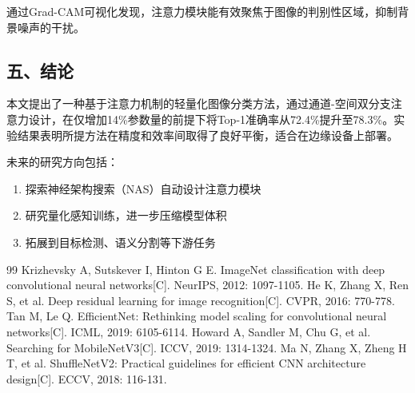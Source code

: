 \documentclass{harryopo-paper}
\begin{document}
通过Grad-CAM可视化发现，注意力模块能有效聚焦于图像的判别性区域，抑制背景噪声的干扰。

\subsection*{五、结论}

本文提出了一种基于注意力机制的轻量化图像分类方法，通过通道-空间双分支注意力设计，在仅增加14\%参数量的前提下将Top-1准确率从72.4\%提升至78.3\%。实验结果表明所提方法在精度和效率间取得了良好平衡，适合在边缘设备上部署。

未来的研究方向包括：

\begin{enumerate}
  \item 探索神经架构搜索（NAS）自动设计注意力模块
  \item 研究量化感知训练，进一步压缩模型体积
  \item 拓展到目标检测、语义分割等下游任务
\end{enumerate}

\begin{thebibliography}{99}
 Krizhevsky A, Sutskever I, Hinton G E. ImageNet classification with deep convolutional neural networks[C]. NeurIPS, 2012: 1097-1105.
 He K, Zhang X, Ren S, et al. Deep residual learning for image recognition[C]. CVPR, 2016: 770-778.
 Tan M, Le Q. EfficientNet: Rethinking model scaling for convolutional neural networks[C]. ICML, 2019: 6105-6114.
 Howard A, Sandler M, Chu G, et al. Searching for MobileNetV3[C]. ICCV, 2019: 1314-1324.
 Ma N, Zhang X, Zheng H T, et al. ShuffleNetV2: Practical guidelines for efficient CNN architecture design[C]. ECCV, 2018: 116-131.
\end{thebibliography}
\end{document}
